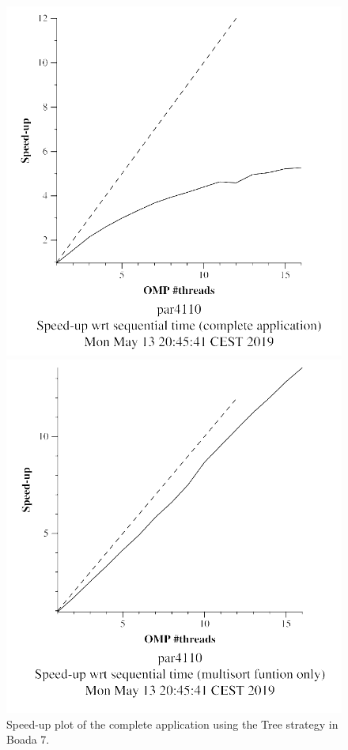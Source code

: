 \documentclass[12pt, a4paper]{article}
\begin{document}
\begin{figure}[H]
\centering
\begin{minipage}[b]{0.4\linewidth}
  \centering
  \includegraphics[scale=0.5]{./images/S2/multisort-omp-strong_boada-7_tree_complete_application}
  \caption{Speed-up plot of the complete application using the Tree strategy in Boada 7.}
  \label{fig:mandel-omp-10000-strong-21-time}
\end{minipage}%
\hspace{0.5cm}
\begin{minipage}[b]{0.4\linewidth}
  \centering
  \includegraphics[scale=0.5]{./images/S2/multisort-omp-strong_boada-7_tree_multisort_only}

\end{minipage}
\end{figure}
\end{document}
